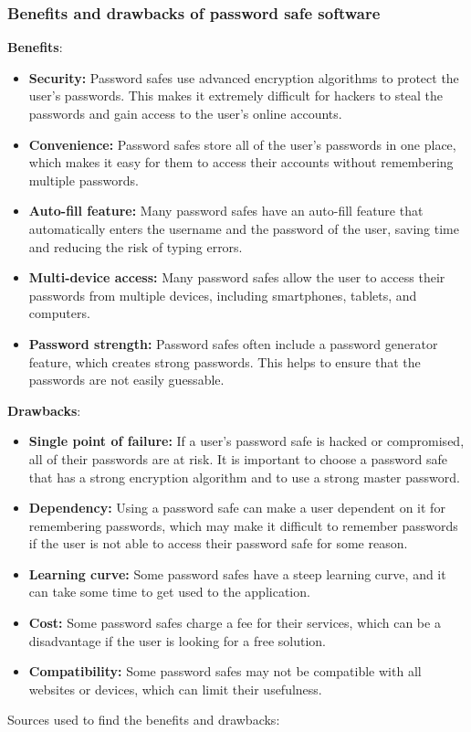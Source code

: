\documentclass[conference]{IEEEtran}
\begin{document}
\subsubsection{Benefits and drawbacks of password safe software}
\textbf{Benefits}:
\begin{itemize}
\item \textbf{Security:} Password safes use advanced encryption algorithms to protect the user's passwords. This makes it extremely difficult for hackers to steal the passwords and gain access to the user's online accounts.
\item \textbf{Convenience:} Password safes store all of the user's passwords in one place, which makes it easy for them to access their accounts without remembering multiple passwords.
\item \textbf{Auto-fill feature:} Many password safes have an auto-fill feature that automatically enters the username and the password of the user, saving time and reducing the risk of typing errors.
\item \textbf{Multi-device access:} Many password safes allow the user to access their passwords from multiple devices, including smartphones, tablets, and computers.
\item \textbf{Password strength:} Password safes often include a password generator feature, which creates strong passwords. This helps to ensure that the passwords are not easily guessable.
\end{itemize}
\textbf{Drawbacks}:
\begin{itemize}
\item \textbf{Single point of failure:} If a user's password safe is hacked or compromised, all of their passwords are at risk. It is important to choose a password safe that has a strong encryption algorithm and to use a strong master password.
\item \textbf{Dependency:} Using a password safe can make a user dependent on it for remembering passwords, which may make it difficult to remember passwords if the user is not able to access their password safe for some reason.
\item \textbf{Learning curve:} Some password safes have a steep learning curve, and it can take some time to get used to the application.
\item \textbf{Cost:} Some password safes charge a fee for their services, which can be a disadvantage if the user is looking for a free solution.
\item \textbf{Compatibility:} Some password safes may not be compatible with all websites or devices, which can limit their usefulness.
\end{itemize}
Sources used to find the benefits and drawbacks: \cite{b8}
\end{document}
